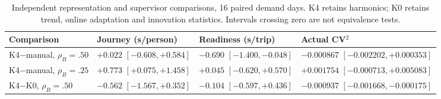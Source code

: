 \begin{table}[t]
\centering
\footnotesize
\caption{Independent representation and supervisor comparisons, 16 paired demand days. K4 retains harmonics; K0 retains trend, online adaptation and innovation statistics. Intervals crossing zero are not equivalence tests.}
\label{tab:supervisor}
\setlength{\tabcolsep}{4pt}
\begin{tabularx}{\textwidth}{@{}lYYY@{}}
\toprule
Comparison & Journey (s/person) & Readiness (s/trip) & Actual CV$^2$ \\
\midrule
K4$-$manual, $\rho_B=.50$ &  &  &  \\[3pt]
K4$-$manual, $\rho_B=.25$ &  &  &  \\[3pt]
K4$-$K0, $\rho_B=.50$ &  &  &  \\[3pt]
\bottomrule
\end{tabularx}
\end{table}
